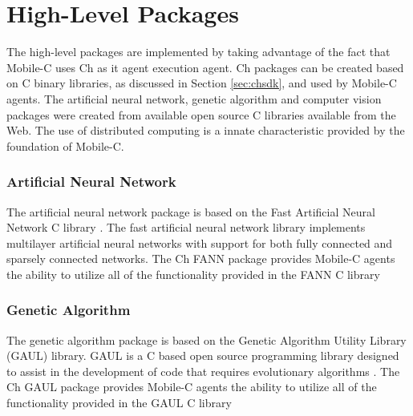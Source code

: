   \section{High-Level Packages} \label{sec:packages}
    The high-level packages are implemented by taking advantage of 
      the fact that Mobile-C uses Ch as it agent execution agent.
    Ch packages can be created based on C binary libraries, as discussed in 
      Section \ref{sec:chsdk}, and used by Mobile-C agents.
    The artificial neural network, genetic algorithm and computer vision 
      packages were created from available open source C libraries available 
      from the Web.
    The use of distributed computing is a innate characteristic provided by the
      foundation of Mobile-C.

    \subsubsection{Artificial Neural Network}
      The artificial neural network package is based on the Fast Artificial 
        Neural Network C library \cite{FANN}.
      The fast artificial neural network library implements multilayer
        artificial neural networks with support for both fully connected and 
        sparsely connected networks.
      The Ch FANN package \cite{chfann} provides Mobile-C agents the ability to 
        utilize all of the functionality provided in the FANN C library

    \subsubsection{Genetic Algorithm}
      The genetic algorithm package is based on the Genetic Algorithm Utility 
        Library (GAUL) library.
      GAUL is a C based open source programming library designed to assist in 
        the development of code that requires evolutionary algorithms 
        \cite{GAULWebSite}.
      The Ch GAUL package \cite{chgaul_website} provides Mobile-C agents
        the ability to utilize all of the functionality provided 
        in the GAUL C library

